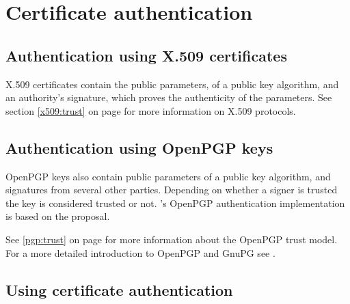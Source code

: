 \section{Certificate authentication}

\subsection*{Authentication using X.509 certificates}

X.509 certificates contain the public parameters, 
of a public key algorithm, and an authority's signature, which proves the
authenticity of the parameters.
See section \ref{x509:trust} on page \pageref{x509:trust} for more information
on X.509 protocols.


\subsection*{Authentication using OpenPGP keys}
\label{sec:pgp}

OpenPGP keys also contain public parameters of a public key algorithm, and
signatures from several other parties. Depending on whether a signer is
trusted the key is considered trusted or not.
\gnutls{}'s OpenPGP authentication implementation is based on the
\cite{TLSPGP} proposal.

See \ref{pgp:trust} on page \pageref{pgp:trust} for more information 
about the OpenPGP trust model. For a more detailed introduction to OpenPGP
and GnuPG see \cite{GPGH}.

\subsection*{Using certificate authentication}


